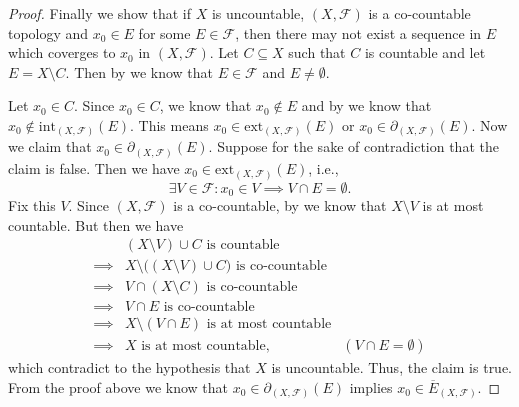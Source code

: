 \begin{proof}
  Finally we show that if \(X\) is uncountable, \((X, \mathcal{F})\) is a co-countable topology and \(x_0 \in E\) for some \(E \in \mathcal{F}\), then there may not exist a sequence in \(E\) which coverges to \(x_0\) in \((X, \mathcal{F})\).
  Let \(C \subseteq X\) such that \(C\) is countable and let \(E = X \setminus C\).
  Then by  we know that \(E \in \mathcal{F}\) and \(E \neq \emptyset\).

  Let \(x_0 \in C\).
  Since \(x_0 \in C\), we know that \(x_0 \notin E\) and by  we know that \(x_0 \notin \text{int}_{(X, \mathcal{F})}(E)\).
  This means \(x_0 \in \text{ext}_{(X, \mathcal{F})}(E)\) or \(x_0 \in \partial_{(X, \mathcal{F})}(E)\).
  Now we claim that \(x_0 \in \partial_{(X, \mathcal{F})}(E)\).
  Suppose for the sake of contradiction that the claim is false.
  Then we have \(x_0 \in \text{ext}_{(X, \mathcal{F})}(E)\), i.e.,
  \[
    \exists V \in \mathcal{F} : x_0 \in V \implies V \cap E = \emptyset.
  \]
  Fix this \(V\).
  Since \((X, \mathcal{F})\) is a co-countable, by  we know that \(X \setminus V\) is at most countable.
  But then we have
  \begin{align*}
             & (X \setminus V) \cup C \text{ is countable}                                                   \\
    \implies & X \setminus \big((X \setminus V) \cup C\big) \text{ is co-countable}                          \\
    \implies & V \cap (X \setminus C) \text{ is co-countable}                                                \\
    \implies & V \cap E \text{ is co-countable}                                                              \\
    \implies & X \setminus (V \cap E) \text{ is at most countable}                                           \\
    \implies & X \text{ is at most countable},                                      & (V \cap E = \emptyset)
  \end{align*}
  which contradict to the hypothesis that \(X\) is uncountable.
  Thus, the claim is true.
  From the proof above we know that \(x_0 \in \partial_{(X, \mathcal{F})}(E)\) implies \(x_0 \in \overline{E}_{(X, \mathcal{F})}\).


\end{proof}
